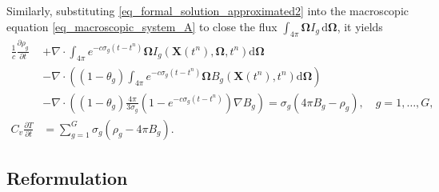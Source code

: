 \documentclass[preprint,12pt]{elsarticle}
\theoremstyle{definition}
\theoremstyle{plain}
\numberwithin{equation}{section}
\numberwithin{algorithm}{section}
\newcounter{eq_count}
\newcounter{subeq_count}
\newcommand{\vOmega}{\mathbf{\Omega}}
\newcommand{\mfx}{{\mathbf{X}}}
\newcommand{\dd}{{\text{d}}}
\newcommand{\pdrv}[2]{\frac{\partial{#1}}{\partial{#2}}}
\begin{document}
    Similarly,  substituting \eqref{eq_formal_solution_approximated2} into the macroscopic equation \eqref{eq_macroscopic_system_A} to close the flux
$\int_{4\pi} \vOmega I_g \,\mathrm{d}\vOmega$, it yields
    \begin{subequations}    \label{eq_macroscopic_system_approximated}
		\begin{align}
			\frac{1}{c} \frac{\partial \rho_g}{\partial t}&+\nabla \cdot\int_{4 \pi}  e^{- c  \sigma_g (t - t^n)} \vOmega   I_{g} ( \mfx(t^n), \vOmega,t^n ) \dd{\vOmega} 
            \\ \nonumber
            & - \nabla \cdot \left( ( 1 - \theta_g  ) \int_{4 \pi}  e^{- c  \sigma_g (t - t^n)} \vOmega  B_g  \left( \mfx(t^n),t^n \right) \dd{\vOmega} \right)
            \\ \nonumber
		  & - \nabla \cdot \left( ( 1 - \theta_g  ) \frac{4 \pi }{3\sigma_{g}}\left(1-e^{-c \sigma_{g}\left(t-t^n\right)}\right) \nabla B_g \right)=  \sigma_{g} ( 4 \pi B_g-\rho_g ),  \quad g=1,\ldots,G, 
            \\  
		  C_v \pdrv{T}{t}&=\sum_{g=1}^{G} \sigma_{g} \left( \rho_g- 4 \pi  B_g\right) .
		\end{align}
    \end{subequations} 

    \subsection{Reformulation}
    
\end{document}
